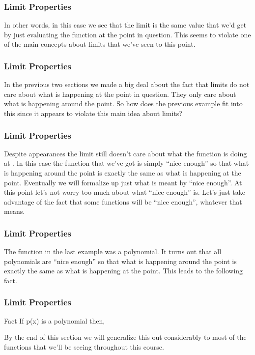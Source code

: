 \documentclass{beamer}
\begin{document}
\begin{frame}[fragile]
	\frametitle{Limit Properties}
	\Large
 
In other words, in this case we see that the limit is the same value that we’d get by just evaluating the function at the point in question.  This seems to violate one of the main concepts about limits that we’ve seen to this point.
\end{frame}
\begin{frame}[fragile]
	\frametitle{Limit Properties}
	\Large
In the previous two sections we made a big deal about the fact that limits do not care about what is happening at the point in question.  They only care about what is happening around the point.  So how does the previous example fit into this since it appears to violate this main idea about limits?
\end{frame}
\begin{frame}[fragile]
	\frametitle{Limit Properties}
	\Large
Despite appearances the limit still doesn’t care about what the function is doing at .  In this case the function that we’ve got is simply “nice enough” so that what is happening around the point is exactly the same as what is happening at the point.  Eventually we will formalize up just what is meant by “nice enough”.  At this point let’s not worry too much about what “nice enough” is.  Let’s just take advantage of the fact that some functions will be “nice enough”, whatever that means.
\end{frame}
\begin{frame}[fragile]
	\frametitle{Limit Properties}
	\Large 
The function in the last example was a polynomial.  It turns out that all polynomials are “nice enough” so that what is happening around the point is exactly the same as what is happening at the point.  This leads to the following fact.
 
\end{frame}
\begin{frame}[fragile]
	\frametitle{Limit Properties}
	\Large 
Fact
If p(x) is a polynomial then,
                                                                 
 
By the end of this section we will generalize this out considerably to most of the functions that we’ll be seeing throughout this course.
 
\end{frame}
\end{document}
